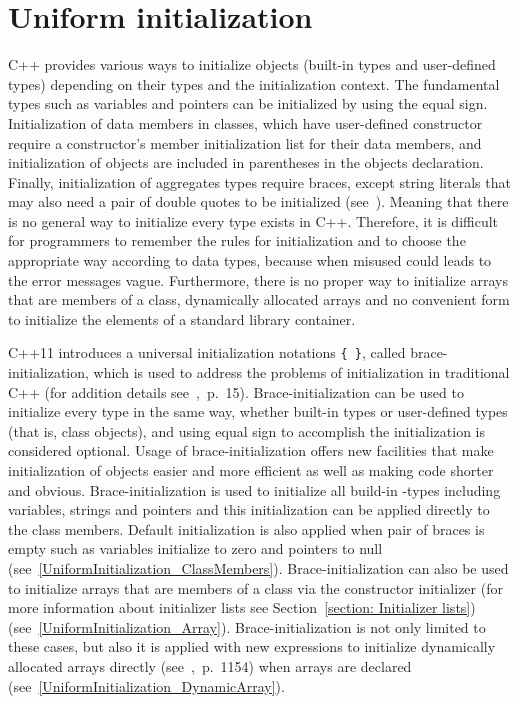 \documentclass[11pt]{report}
\begin{document}
\section{Uniform initialization}
\label{section:Uniform initialization}
C++ provides various ways to initialize objects (built-in types and user-defined types) depending on their types and the initialization context. The fundamental types such as variables and pointers can be initialized by using the equal sign. Initialization of data members in classes, which have user-defined constructor require a constructor's member initialization list for their data members, and initialization of objects are included in parentheses in the objects declaration. Finally, initialization of aggregates types require braces, except string literals that may also need a pair of double quotes to be initialized (see~\cite{Stroustrup:2012:Cpp11}). Meaning that there is no general way to initialize every type exists in C++. Therefore, it is difficult for programmers to remember the rules for initialization and to choose the appropriate way according to data types, because when misused could leads to the error messages vague. Furthermore, there is no proper way to initialize arrays that are members of a class, dynamically allocated arrays and no convenient form to initialize the elements of a standard library container.

C++11 introduces a universal initialization notations \texttt{\{ \}}, called brace-initialization, which is used to address the problems of initialization in traditional C++ (for addition details see~\cite{Reddy:2011:API},~p.~15). Brace-initialization can be used to initialize every type in the same way, whether built-in types or user-defined types (that is, class objects), and using equal sign to accomplish the initialization is considered optional. Usage of brace-initialization offers new facilities that make initialization of objects easier and more efficient as well as making code shorter and obvious.
Brace-initialization is used to initialize all build-in -types including variables, strings and pointers and this initialization can be applied directly to the class members. Default initialization is also applied when pair of braces is empty such as variables initialize to zero and pointers to null (see~\ref{UniformInitialization_ClassMembers}). Brace-initialization can also be used to initialize arrays that are members of a class via the constructor initializer (for more information about initializer lists see Section~\ref{section: Initializer lists}) (see~\ref{UniformInitialization_Array}). Brace-initialization is not only limited to these cases, but also it is applied with new expressions to initialize dynamically allocated arrays directly (see~\cite{Prata:2012:Cpp},~p.~1154) when arrays are declared (see~\ref{UniformInitialization_DynamicArray}).
\end{document}
